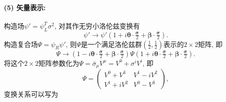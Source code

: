 \paragraph*{(5) 矢量表示: }
构造场$\psi'=\psi^T_L \sigma^2$, 对其作无穷小洛伦兹变换有
\begin{equation}
  \psi' \rightarrow \psi'(1 + i\bm{\theta}\cdot\tfrac{\bm{\sigma}}{2} + \bm{\beta}\cdot\tfrac{\bm{\sigma}}{2}).
\end{equation}
构造复合场$\Psi = \psi_R \psi'$, 则$\Psi$是一个满足洛伦兹群$(\frac{1}{2}, \frac{1}{2})$表示的$2\times 2$矩阵, 即
\begin{equation}
  \Psi \rightarrow (1 - i\bm{\theta}\cdot\tfrac{\bm{\sigma}}{2} + \bm{\beta}\cdot\tfrac{\bm{\sigma}}{2}) \Psi (1 + i\bm{\theta}\cdot\tfrac{\bm{\sigma}}{2} + \bm{\beta}\cdot\tfrac{\bm{\sigma}}{2}).
\end{equation}
将这个$2\times 2$矩阵参数化为$\Psi = \bar{\sigma}_{\mu}V^{\mu} = V^0 + \sigma^i V^i$, 即
\begin{equation}
  \Psi = \begin{pmatrix}
    V^0+V^3  & V^1-iV^2 \\
    V^1+iV^2 & V^0-V^3
  \end{pmatrix},
\end{equation}
变换关系可以写为
